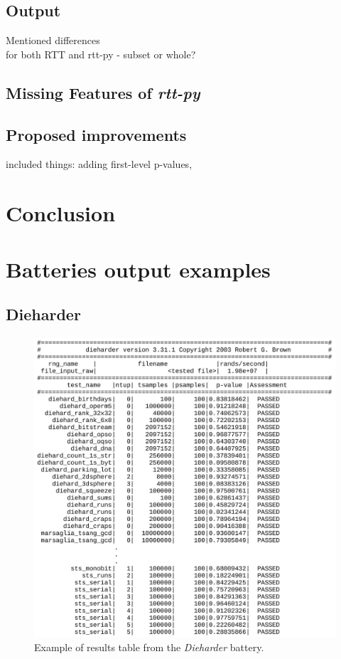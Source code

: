\documentclass[
  digital,     %
  oneside,     %
  nosansbold,  %
  nocolorbold, %
  nolof,         %
  nolot,         %
]{fithesis4}
\begin{document}
\section{Output}
Mentioned differences\\
for both RTT and rtt-py - subset or whole?

\section{Missing Features of \emph{rtt-py}}

\section{Proposed improvements}
included things: adding first-level p-values, 


\chapter{Conclusion}

\appendix 

\chapter{Batteries output examples} \label{append:dieharder-output}
\section{Dieharder}

\begin{figure}[h]
  \begin{center}
    \includegraphics[width=12.5cm]{figures/outputs-appendix/dieharder.jpg}
  \end{center}
  \caption{Example of results table from the \emph{Dieharder} battery.}
  \label{fig:die_out}
\end{figure}
\end{document}
